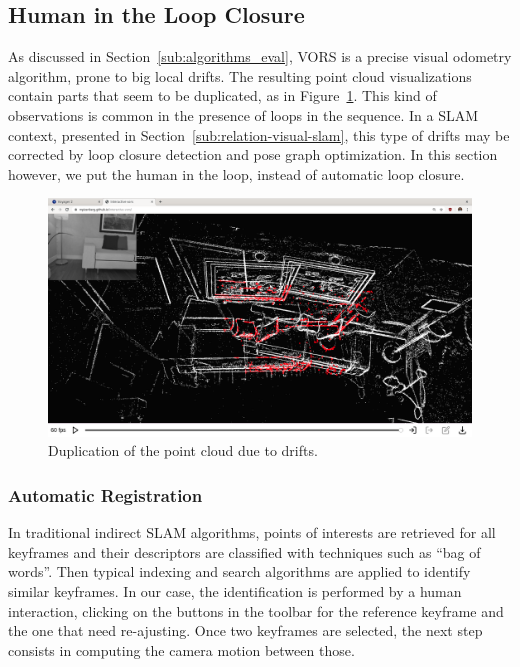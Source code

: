 \subsection{Human in the Loop Closure}%
\label{sub:human-loop-closure}

As discussed in Section~\ref{sub:algorithms_eval},
VORS is a precise visual odometry algorithm, prone to big local drifts.
The resulting point cloud visualizations contain parts that seem to be duplicated,
as in Figure~\ref{fig:interactive-vors-drift}.
This kind of observations is common in the presence of loops in the sequence.
In a SLAM context, presented in Section~\ref{sub:relation-visual-slam},
this type of drifts may be corrected by loop closure detection and pose graph optimization.
In this section however, we put the human in the loop, instead of automatic loop closure.

\begin{figure}[ht]
	\centering
	\includegraphics[width=\linewidth]{assets/img/interactive-vors-drift.png}
	\caption{Duplication of the point cloud due to drifts.}%
	\label{fig:interactive-vors-drift}
\end{figure}

\subsubsection{Automatic Registration}%

In traditional indirect SLAM algorithms, points of interests are retrieved for all keyframes
and their descriptors are classified with techniques such as ``bag of words''.
Then typical indexing and search algorithms are applied to identify similar keyframes.
In our case, the identification is performed by a human interaction,
clicking on the buttons in the toolbar for the reference keyframe
and the one that need re-ajusting.
Once two keyframes are selected, the next step consists in computing
the camera motion between those.


